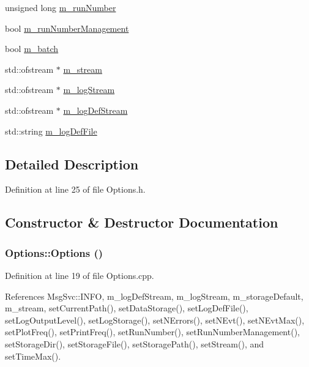\begin{DoxyCompactItemize}
unsigned long \hyperlink{classOptions_a1762c644c5f87feabe12f84f17a1a351}{m\_\-runNumber}
\item 
bool \hyperlink{classOptions_a2ad2d67b98fc5fbea4cbbd781ccb6183}{m\_\-runNumberManagement}
\item 
bool \hyperlink{classOptions_ae4461f1dd3357c0478098fc32e809405}{m\_\-batch}
\item 
std::ofstream $\ast$ \hyperlink{classOptions_a8c5485cd614fa90de6b1aa85a7d2191b}{m\_\-stream}
\item 
std::ofstream $\ast$ \hyperlink{classOptions_a65c3a025880fb38373b599b87d600eef}{m\_\-logStream}
\item 
std::ofstream $\ast$ \hyperlink{classOptions_aebb2db3fb07ea1f73b27bde841be69d8}{m\_\-logDefStream}
\item 
std::string \hyperlink{classOptions_abaef6cdcc8422b199084510d173edbe6}{m\_\-logDefFile}
\end{DoxyCompactItemize}


\subsection{Detailed Description}


Definition at line 25 of file Options.h.

\subsection{Constructor \& Destructor Documentation}
\hypertarget{classOptions_ab72fb640172a6109e34c8a5366563753}{
\subsubsection[{Options}]{\setlength{\rightskip}{0pt plus 5cm}Options::Options ()}}
\label{classOptions_ab72fb640172a6109e34c8a5366563753}


Definition at line 19 of file Options.cpp.

References MsgSvc::INFO, m\_\-logDefStream, m\_\-logStream, m\_\-storageDefault, m\_\-stream, setCurrentPath(), setDataStorage(), setLogDefFile(), setLogOutputLevel(), setLogStorage(), setNErrors(), setNEvt(), setNEvtMax(), setPlotFreq(), setPrintFreq(), setRunNumber(), setRunNumberManagement(), setStorageDir(), setStorageFile(), setStoragePath(), setStream(), and setTimeMax().


